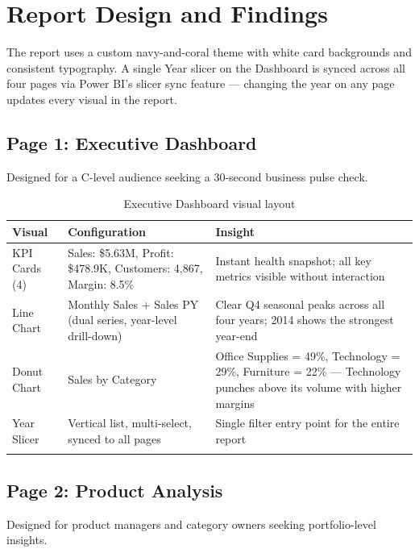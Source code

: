 \documentclass[11pt,a4paper]{article}
\begin{document}
\newpage

\section{Report Design and Findings}

The report uses a custom navy-and-coral theme with white card backgrounds and consistent typography. A single Year slicer on the Dashboard is synced across all four pages via Power BI's slicer sync feature --- changing the year on any page updates every visual in the report.

\subsection{Page 1: Executive Dashboard}

Designed for a C-level audience seeking a 30-second business pulse check.

\begin{longtable}{p{3cm} p{5.5cm} p{5.5cm}}
\toprule
\textbf{Visual} & \textbf{Configuration} & \textbf{Insight} \\
\midrule
\endhead
KPI Cards (4) & Sales: \$5.63M, Profit: \$478.9K, Customers: 4,867, Margin: 8.5\% & Instant health snapshot; all key metrics visible without interaction \\
Line Chart & Monthly Sales + Sales PY (dual series, year-level drill-down) & Clear Q4 seasonal peaks across all four years; 2014 shows the strongest year-end \\
Donut Chart & Sales by Category & Office Supplies = 49\%, Technology = 29\%, Furniture = 22\% --- Technology punches above its volume with higher margins \\
Year Slicer & Vertical list, multi-select, synced to all pages & Single filter entry point for the entire report \\
\bottomrule
\caption{Executive Dashboard visual layout}
\end{longtable}

\subsection{Page 2: Product Analysis}

Designed for product managers and category owners seeking portfolio-level insights.
\end{document}
